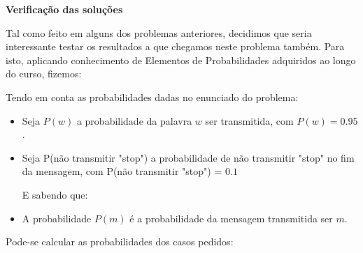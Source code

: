 \documentclass[11pt, a4paper, fleqn]{article}
\begin{document}
\textbf{Verificação das soluções}

Tal como feito em alguns dos problemas anteriores, decidimos que seria interessante testar os resultados a que chegamos neste problema também. Para isto, aplicando conhecimento de Elementos de Probabilidades adquiridos ao longo do curso, fizemos:

Tendo em conta as probabilidades dadas no enunciado do problema:
\begin{itemize}
     \item Seja $P(w)$ a probabilidade da palavra $w$ ser transmitida, com $P(w)=0.95$. 
     \item Seja P(não transmitir "stop") a probabilidade de não transmitir "stop" no fim da mensagem, com P(não transmitir "stop") = $0.1$

     E sabendo que:
     \item A probabilidade $P(m)$ é a probabilidade da mensagem transmitida ser $m$.
\end{itemize}

Pode-se calcular as probabilidades dos casos pedidos:
\end{document}
